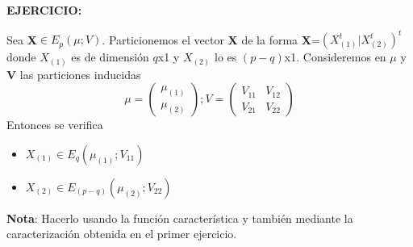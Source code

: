 \documentclass{article}
\theoremstyle{theorem-style}  %
\theoremstyle{definition}
\theoremstyle{example-style}
\begin{document}
		\textbf{EJERCICIO:}
		
		Sea \textbf{X}$\in E_p(\mu; V)$. Particionemos el vector \textbf{X} de la forma \textbf{X}=$(X^t_{(1)}|X^t_{(2)})^t$ donde $X_{(1)}$ es de dimensión $q$x1 y $X_{(2)}$ lo es $(p-q)$x1. Consideremos en $\mu$ y \textbf{V} las particiones inducidas
		$$\mu = \left( \begin{array}{c}
						\mu_{(1)} \\ \mu_{(2)}
						\end{array}\right);
		V = \left( \begin{array}{cc}
					V_{11} & V_{12} \\ V_{21} & V_{22}
					\end{array}\right)$$
		Entonces se verifica
		\begin{itemize}
			\item $X_{(1)} \in E_q(\mu_{(1)}; V_{11})$
			\item $X_{(2)} \in E_{(p-q)}(\mu_{(2)}; V_{22})$
		\end{itemize}
		
		\textbf{Nota}: Hacerlo usando la función característica y también mediante la caracterización obtenida en el primer ejercicio.
		
\end{document}
